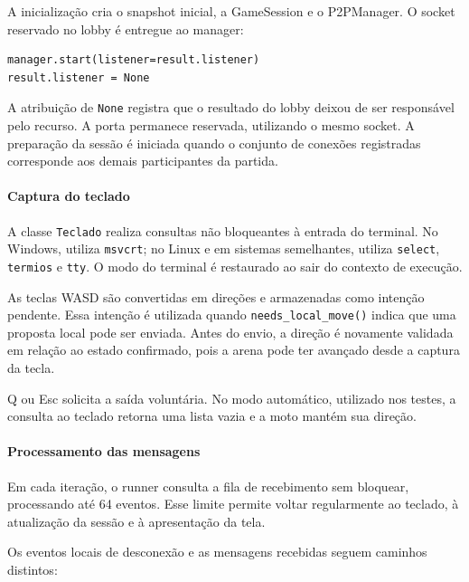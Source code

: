 \documentclass[11pt,a4paper]{article}
\begin{document}
A inicialização cria o snapshot inicial, a GameSession e o P2PManager. O socket reservado no lobby é entregue ao manager:

\par\smallskip
\noindent
\begin{minipage}{\linewidth}
\begin{verbatim}
manager.start(listener=result.listener)
result.listener = None
\end{verbatim}
\end{minipage}
\par\smallskip

A atribuição de \texttt{None} registra que o resultado do lobby deixou de ser responsável pelo recurso. A porta permanece reservada, utilizando o mesmo socket. A preparação da sessão é iniciada quando o conjunto de conexões registradas corresponde aos demais participantes da partida.

\paragraph{Captura do teclado}

A classe \texttt{Teclado} realiza consultas não bloqueantes à entrada do terminal. No Windows, utiliza \texttt{msvcrt}; no Linux e em sistemas semelhantes, utiliza \texttt{select}, \texttt{termios} e \texttt{tty}. O modo do terminal é restaurado ao sair do contexto de execução.

As teclas WASD são convertidas em direções e armazenadas como intenção pendente. Essa intenção é utilizada quando \texttt{needs\_local\_move()} indica que uma proposta local pode ser enviada. Antes do envio, a direção é novamente validada em relação ao estado confirmado, pois a arena pode ter avançado desde a captura da tecla.

Q ou Esc solicita a saída voluntária. No modo automático, utilizado nos testes, a consulta ao teclado retorna uma lista vazia e a moto mantém sua direção.

\paragraph{Processamento das mensagens}

Em cada iteração, o runner consulta a fila de recebimento sem bloquear, processando até 64 eventos. Esse limite permite voltar regularmente ao teclado, à atualização da sessão e à apresentação da tela.

Os eventos locais de desconexão e as mensagens recebidas seguem caminhos distintos:
\end{document}
